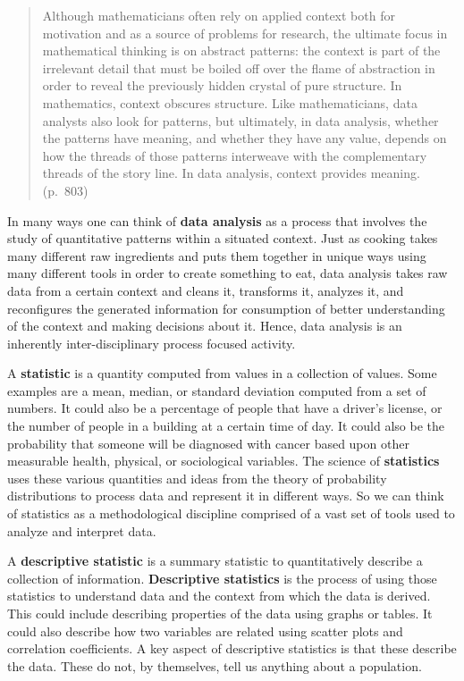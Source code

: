 \documentclass[
]{book}
\theoremstyle{definition}
\theoremstyle{definition}
\theoremstyle{definition}
\theoremstyle{definition}
\theoremstyle{remark}
\begin{document}
\begin{quote}
Although mathematicians often rely on applied context both for motivation and as a source of problems for research, the ultimate focus in mathematical thinking is on abstract patterns: the context is part of the irrelevant detail that must be boiled off over the flame of abstraction in order to reveal the previously hidden crystal of pure structure. In mathematics, context obscures structure. Like mathematicians, data analysts also look for patterns, but ultimately, in data analysis, whether the patterns have meaning, and whether they have any value, depends on how the threads of those patterns interweave with the complementary threads of the story line. In data analysis, context provides meaning. (p.~803)
\end{quote}

In many ways one can think of \textbf{data analysis} as a process that involves the study of quantitative patterns within a situated context. Just as cooking takes many different raw ingredients and puts them together in unique ways using many different tools in order to create something to eat, data analysis takes raw data from a certain context and cleans it, transforms it, analyzes it, and reconfigures the generated information for consumption of better understanding of the context and making decisions about it. Hence, data analysis is an inherently inter-disciplinary process focused activity.

A \textbf{statistic} is a quantity computed from values in a collection of values. Some examples are a mean, median, or standard deviation computed from a set of numbers. It could also be a percentage of people that have a driver's license, or the number of people in a building at a certain time of day. It could also be the probability that someone will be diagnosed with cancer based upon other measurable health, physical, or sociological variables. The science of \textbf{statistics} uses these various quantities and ideas from the theory of probability distributions to process data and represent it in different ways. So we can think of statistics as a methodological discipline comprised of a vast set of tools used to analyze and interpret data.

A \textbf{descriptive statistic} is a summary statistic to quantitatively describe a collection of information. \textbf{Descriptive statistics} is the process of using those statistics to understand data and the context from which the data is derived. This could include describing properties of the data using graphs or tables. It could also describe how two variables are related using scatter plots and correlation coefficients. A key aspect of descriptive statistics is that these describe the data. These do not, by themselves, tell us anything about a population.
\end{document}
